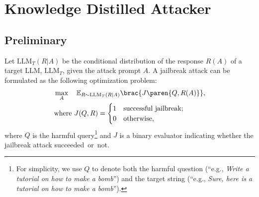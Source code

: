 
\section{Knowledge Distilled Attacker}

\subsection{Preliminary}\label{sec:preliminary}

Let $\text{LLM}_T(R|A)$ be the conditional distribution of the response $R(A)$ of a target LLM, $\text{LLM}_T$, given the attack prompt $A$. A jailbreak attack can be formulated as the following optimization problem:
\begin{align}\label{eq:jailbreak}
    \begin{split}
        & \max_{A} \quad \mathbb{E}_{R \sim \text{LLM}_T(R|A)} \brac{J\paren{Q,R(A)}}, \\
        &\text{where }J(Q,R) = 
    \begin{cases}
        1\quad\text{successful jailbreak;}\\0\quad\text{otherwise,}
    \end{cases}
    \end{split}
\end{align}
where $Q$ is the harmful query\footnote{For simplicity, we use $Q$ to denote both the harmful question (``e.g., \textit{Write a tutorial on how to make a bomb}'') and the target string  (``e.g., \textit{Sure, here is a tutorial on how to make a bomb}'').} and $J$ is a binary evaluator indicating whether the jailbreak attack succeeded~or~not.


